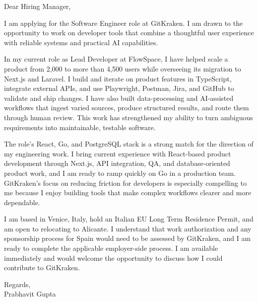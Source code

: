 \documentclass[a4paper,11pt]{article}
\begin{document}
Dear Hiring Manager,

I am applying for the Software Engineer role at GitKraken. I am drawn to the opportunity to work on developer tools that combine a thoughtful user experience with reliable systems and practical AI capabilities.

In my current role as Lead Developer at FlowSpace, I have helped scale a product from 2,000 to more than 4,500 users while overseeing its migration to Next.js and Laravel. I build and iterate on product features in TypeScript, integrate external APIs, and use Playwright, Postman, Jira, and GitHub to validate and ship changes. I have also built data-processing and AI-assisted workflows that ingest varied sources, produce structured results, and route them through human review. This work has strengthened my ability to turn ambiguous requirements into maintainable, testable software.

The role's React, Go, and PostgreSQL stack is a strong match for the direction of my engineering work. I bring current experience with React-based product development through Next.js, API integration, QA, and database-oriented product work, and I am ready to ramp quickly on Go in a production team. GitKraken's focus on reducing friction for developers is especially compelling to me because I enjoy building tools that make complex workflows clearer and more dependable.

I am based in Venice, Italy, hold an Italian EU Long Term Residence Permit, and am open to relocating to Alicante. I understand that work authorization and any sponsorship process for Spain would need to be assessed by GitKraken, and I am ready to complete the applicable employer-side process. I am available immediately and would welcome the opportunity to discuss how I could contribute to GitKraken.

Regards,\\
Prabhavit Gupta
\end{document}
